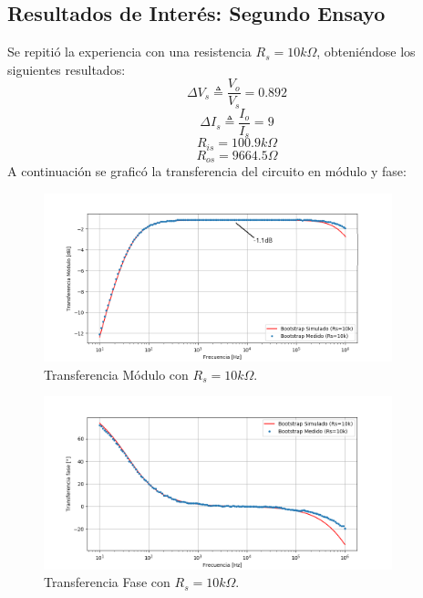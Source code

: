 \subsection{Resultados de Interés: Segundo Ensayo}
Se repitió la experiencia con una resistencia $R_s = 10k\Omega$, obteniéndose los siguientes resultados:
\begin{equation}
\Delta V_s \triangleq \frac{V_o}{V_s} = 0.892
\end{equation}
\begin{equation}
\Delta I_s \triangleq \frac{I_o}{I_s} = 9
\end{equation}
\begin{equation}
R_{is} = 100.9k\Omega
\end{equation}
\begin{equation}
R_{os} = 9664.5\Omega
\end{equation}
A continuación se graficó la transferencia del circuito en módulo y fase:

\begin{figure} [H]
	\centering
	\includegraphics[width=0.9\textwidth]{imagenes/avs10k.png}
	\caption{Transferencia Módulo con $R_s = 10k\Omega$.}
	\label{fig:transmod}
\end{figure}

\begin{figure} [H]
	\centering
	\includegraphics[width=0.9\textwidth]{imagenes/avsp10k.png}
	\caption{Transferencia Fase con $R_s = 10k\Omega$.}
	\label{fig:transmod}
\end{figure}

